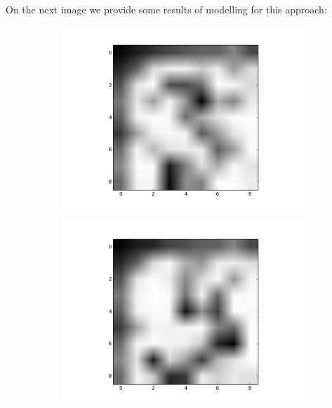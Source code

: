 \documentclass{article}
\begin{document}
On the next image we provide some results of modelling for this approach:
\begin{figure}[ht]
        \centering
        \begin{subfigure}[b]{0.5\textwidth}
                \includegraphics[width=\textwidth]{../combined_1.png}
        \end{subfigure}%
        \begin{subfigure}[b]{0.5\textwidth}
                \includegraphics[width=\textwidth]{../combined_2.png}
        \end{subfigure}
        \begin{subfigure}[b]{0.5\textwidth}

\end{subfigure}
\end{figure}
\end{document}
